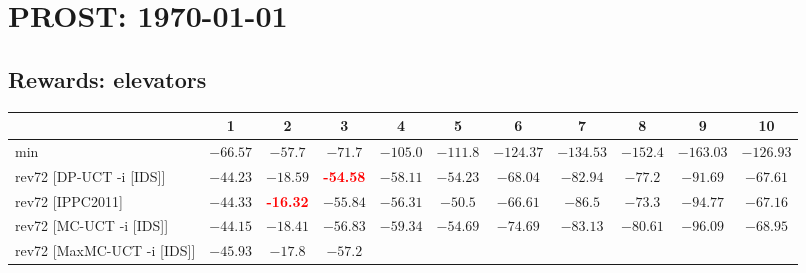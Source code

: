 \documentclass{article}
\begin{document}
\section*{PROST: \today\ \thistime}

\subsection*{Rewards: elevators}

\begin{tabular}{|l|r@{$\pm$}rr@{$\pm$}rr@{$\pm$}rr@{$\pm$}rr@{$\pm$}rr@{$\pm$}rr@{$\pm$}rr@{$\pm$}rr@{$\pm$}rr@{$\pm$}r|}
\hline

& \multicolumn{2}{c}{1}
& \multicolumn{2}{c}{2}
& \multicolumn{2}{c}{3}
& \multicolumn{2}{c}{4}
& \multicolumn{2}{c}{5}
& \multicolumn{2}{c}{6}
& \multicolumn{2}{c}{7}
& \multicolumn{2}{c}{8}
& \multicolumn{2}{c}{9}
& \multicolumn{2}{c|}{10}
\\
\hline
\hline
min
& \multicolumn{2}{c}{$-66.57$}
& \multicolumn{2}{c}{$-57.7$}
& \multicolumn{2}{c}{$-71.7$}
& \multicolumn{2}{c}{$-105.0$}
& \multicolumn{2}{c}{$-111.8$}
& \multicolumn{2}{c}{$-124.37$}
& \multicolumn{2}{c}{$-134.53$}
& \multicolumn{2}{c}{$-152.4$}
& \multicolumn{2}{c}{$-163.03$}
& \multicolumn{2}{c|}{$-126.93$}
\\
rev72 [DP-UCT -i [IDS]]
& \multicolumn{2}{c}{$-44.23$}
& \multicolumn{2}{c}{$-18.59$}
& \multicolumn{2}{c}{\textbf{\textcolor{red}{-54.58}}}
& \multicolumn{2}{c}{$-58.11$}
& \multicolumn{2}{c}{$-54.23$}
& \multicolumn{2}{c}{$-68.04$}
& \multicolumn{2}{c}{$-82.94$}
& \multicolumn{2}{c}{$-77.2$}
& \multicolumn{2}{c}{$-91.69$}
& \multicolumn{2}{c|}{$-67.61$}
\\
rev72 [IPPC2011]
& \multicolumn{2}{c}{$-44.33$}
& \multicolumn{2}{c}{\textbf{\textcolor{red}{-16.32}}}
& \multicolumn{2}{c}{$-55.84$}
& \multicolumn{2}{c}{$-56.31$}
& \multicolumn{2}{c}{$-50.5$}
& \multicolumn{2}{c}{$-66.61$}
& \multicolumn{2}{c}{$-86.5$}
& \multicolumn{2}{c}{$-73.3$}
& \multicolumn{2}{c}{$-94.77$}
& \multicolumn{2}{c|}{$-67.16$}
\\
rev72 [MC-UCT -i [IDS]]
& \multicolumn{2}{c}{$-44.15$}
& \multicolumn{2}{c}{$-18.41$}
& \multicolumn{2}{c}{$-56.83$}
& \multicolumn{2}{c}{$-59.34$}
& \multicolumn{2}{c}{$-54.69$}
& \multicolumn{2}{c}{$-74.69$}
& \multicolumn{2}{c}{$-83.13$}
& \multicolumn{2}{c}{$-80.61$}
& \multicolumn{2}{c}{$-96.09$}
& \multicolumn{2}{c|}{$-68.95$}
\\
rev72 [MaxMC-UCT -i [IDS]]
& \multicolumn{2}{c}{$-45.93$}
& \multicolumn{2}{c}{$-17.8$}
& \multicolumn{2}{c}{$-57.2$}

\end{tabular}
\end{document}
